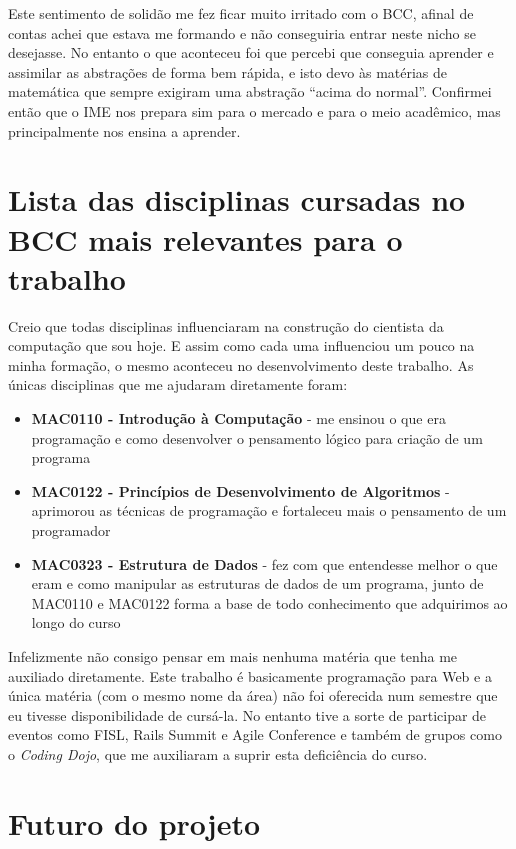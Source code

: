 \documentclass[11pt,a4paper]{article}
\begin{document}
Este sentimento de solidão me fez ficar muito irritado com o BCC, afinal de contas achei que estava me formando e não conseguiria entrar neste nicho se desejasse. No entanto o que aconteceu foi que percebi que conseguia aprender e assimilar as abstrações de forma bem rápida, e isto devo às matérias de matemática que sempre exigiram uma abstração ``acima do normal''. Confirmei então que o IME nos prepara sim para o mercado e para o meio acadêmico, mas principalmente nos ensina a aprender.

\section{Lista das disciplinas cursadas no BCC mais relevantes para o trabalho}
Creio que todas disciplinas influenciaram na construção do cientista da computação que sou hoje. E assim como cada uma influenciou um pouco na minha formação, o mesmo aconteceu no desenvolvimento deste trabalho. As únicas disciplinas que me ajudaram diretamente foram:

\begin{itemize}
	\item \textbf{MAC0110 - Introdução à Computação} - me ensinou o que era programação e como desenvolver o pensamento lógico para criação de um programa
	\item \textbf{MAC0122 - Princípios de Desenvolvimento de Algoritmos} - aprimorou as técnicas de programação e fortaleceu mais o pensamento de um programador
	\item \textbf{MAC0323 - Estrutura de Dados} - fez com que entendesse melhor o que eram e como manipular as estruturas de dados de um programa, junto de MAC0110 e MAC0122 forma a base de todo conhecimento que adquirimos ao longo do curso
\end{itemize}

Infelizmente não consigo pensar em mais nenhuma matéria que tenha me auxiliado diretamente. Este trabalho é basicamente programação para Web e a única matéria (com o mesmo nome da área) não foi oferecida num semestre que eu tivesse disponibilidade de cursá-la. No entanto tive a sorte de participar de eventos como FISL, Rails Summit e Agile Conference e também de grupos como o \emph{Coding Dojo}, que me auxiliaram a suprir esta deficiência do curso.






\section{Futuro do projeto}
\end{document}
